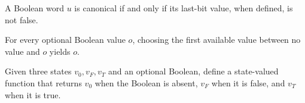 \begin{lemma}
\label{Complexity.LogProg.canon_iff}
\leanok
{}
A Boolean word $u$ is canonical if and only if its last-bit value, when defined, is not
false.
\end{lemma}

\begin{lemma}
\label{Complexity.LogProg.none_orElse'}
\leanok
{}
For every optional Boolean value $o$, choosing the first available value between no
value and $o$ yields $o$.
\end{lemma}

\begin{definition}
\label{Complexity.LogProg.wSt}
\leanok
Given three states $v_0,v_F,v_T$ and an optional Boolean, define a state-valued function
that returns $v_0$ when the Boolean is absent, $v_F$ when it is false, and $v_T$ when it
is true.
\end{definition}

